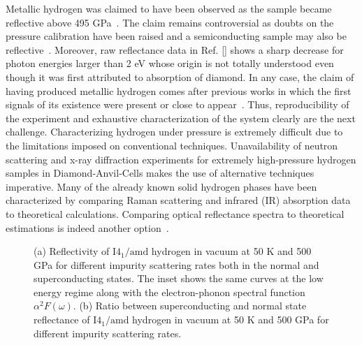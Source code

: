 \documentclass[%
 reprint,
superscriptaddress,
 amsmath,amssymb,
 aps,
prb,
floatfix,
]{revtex4-1}
\begin{document}
Metallic hydrogen was claimed to have been observed as the sample
became reflective above 495 GPa~\cite{Diaseaal1579}.
The claim remains controversial as doubts on the pressure calibration
have been raised and a semiconducting sample may also be reflective~\cite{Eremets2017,Loubeyre2017,Liu2017,Goncharov2017}.
Moreover, raw reflectance data in Ref. [] 
shows a sharp decrease for photon energies larger than 2 eV whose origin is not 
totally understood even though it was first attributed to absorption of diamond\cite{Dias2017}. 
In any case, the claim of 
having produced metallic hydrogen comes after previous works in which the first
signals of its existence were present or close to 
appear~\cite{Dalladay-Simpson2016,Eremets2016}. 
Thus, reproducibility of the experiment and exhaustive characterization of the system 
clearly are the next challenge.
Characterizing hydrogen under pressure is extremely difficult due to the 
limitations imposed on conventional techniques. Unavailability of neutron scattering 
and x-ray diffraction experiments for extremely high-pressure hydrogen samples in Diamond-Anvil-Cells
makes the use of alternative techniques imperative. Many of the already known solid hydrogen 
phases have been characterized by comparing Raman scattering and infrared (IR)
absorption data to theoretical 
calculations\cite{PhysRevLett.108.146402,Goncharov04122001,Eremets2011,
PhysRevLett.108.125501,PhysRevLett.110.217402,Dalladay-Simpson2016,pickard:473}. 
Comparing optical reflectance spectra to theoretical estimations 
is indeed another option~\cite{Diaseaal1579,Perucchi2009}.  

\begin{figure*}[t]
\hfill%
\caption{
(a) Reflectivity of $\mathrm{I4_1/amd}$ hydrogen in vacuum at 50 K and 500 GPa for different 
impurity scattering rates both in the normal and superconducting states. 
The inset shows the same curves at the low energy regime along with the electron-phonon 
spectral function $\alpha^2F(\omega)$. 
(b) Ratio between superconducting and normal state reflectance of 
$\mathrm{I4_1/amd}$ hydrogen in vacuum at 50 K and 500 GPa for different impurity 
scattering rates. 
\label{fig1}}
\end{figure*}
\end{document}
